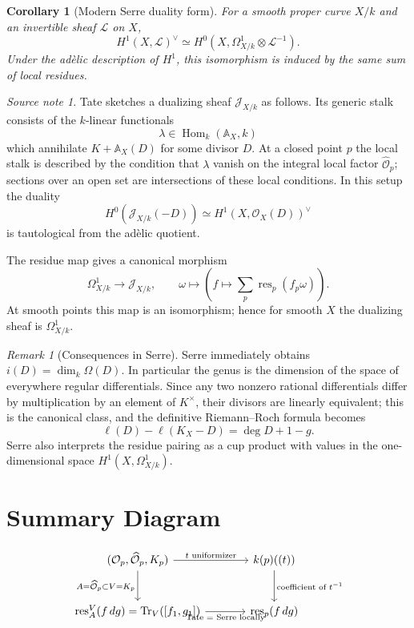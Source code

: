 \documentclass[11pt,a4paper]{article}
\newcommand{\OO}{\mathcal O}
\newcommand{\wideO}{\widehat{\mathcal O}}
\newcommand{\AX}{\mathbb A_X}
\newcommand{\Hom}{\operatorname{Hom}}
\newcommand{\res}{\operatorname{res}}
\newcommand{\Tr}{\operatorname{Tr}}
\theoremstyle{definition}
\theoremstyle{plain}
\newtheorem{corollary}[definition]{Corollary}
\theoremstyle{remark}
\newtheorem*{remark}{Remark}
\newtheorem*{source}{Source note}
\begin{document}
\begin{corollary}[Modern Serre duality form]
For a smooth proper curve $X/k$ and an invertible sheaf $\mathcal L$ on $X$,
\[
  H^1(X,\mathcal L)^\vee
  \simeq
  H^0(X,\Omega^1_{X/k}\otimes \mathcal L^{-1}).
\]
Under the adèlic description of $H^1$, this isomorphism is induced by the same sum of local residues.
\end{corollary}

\begin{source}
Tate sketches a dualizing sheaf $\mathcal J_{X/k}$ as follows.  Its generic stalk consists of the $k$-linear functionals
\[
  \lambda\in\Hom_k(\AX,k)
\]
which annihilate $K+\AX(D)$ for some divisor $D$.  At a closed point $p$ the local stalk is described by the condition that $\lambda$ vanish on the integral local factor $\wideO_p$; sections over an open set are intersections of these local conditions.  In this setup the duality
\[
  H^0(\mathcal J_{X/k}(-D))
  \simeq
  H^1(X,\OO_X(D))^\vee
\]
is tautological from the adèlic quotient.

The residue map gives a canonical morphism
\[
  \Omega^1_{X/k}\longrightarrow \mathcal J_{X/k},
  \qquad
  \omega\longmapsto (f\mapsto \sum_p\res_p(f_p\omega)).
\]
At smooth points this map is an isomorphism; hence for smooth $X$ the dualizing sheaf is $\Omega^1_{X/k}$.
\end{source}

\begin{remark}[Consequences in Serre]
Serre immediately obtains $i(D)=\dim_k\Omega(D)$.  In particular the genus is the dimension of the space of everywhere regular differentials.  Since any two nonzero rational differentials differ by multiplication by an element of $K^\times$, their divisors are linearly equivalent; this is the canonical class, and the definitive Riemann--Roch formula becomes
\[
  \ell(D)-\ell(K_X-D)=\deg D+1-g.
\]
Serre also interprets the residue pairing as a cup product with values in the one-dimensional space $H^1(X,\Omega^1_{X/k})$.
\end{remark}

\section{Summary Diagram}

\[
\begin{tikzcd}[column sep=large,row sep=large]
(\OO_p,\wideO_p,K_p) \arrow[r,"t\text{ uniformizer}"] \arrow[d,"A=\wideO_p\subset V=K_p"']
& k(p)((t)) \arrow[d,"\text{coefficient of }t^{-1}"] \\
\res_A^V(f\,dg)=\Tr_V([f_1,g_1]) \arrow[r,"\text{Tate = Serre locally}"']
& \res_p(f\,dg)
\end{tikzcd}
\]
\end{document}

